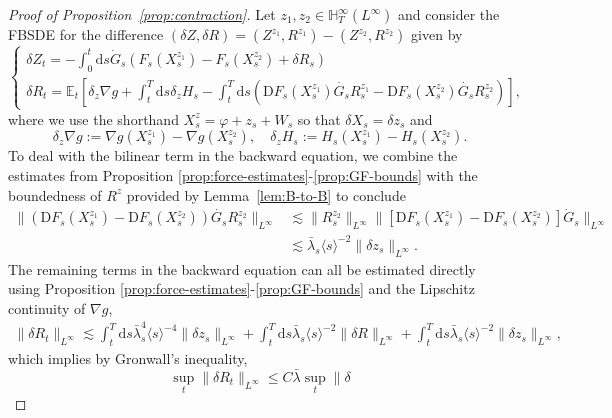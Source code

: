 \documentclass[11pt, a4paper]{scrartcl}
\numberwithin{equation}{section}
\theoremstyle{plain}
\theoremstyle{remark}
\newcommand{\assign}{:=}
\newcommand{\mathD}{\mathrm{D}}
\newcommand{\mathd}{\mathrm{d}}
\begin{document}
\begin{proof}[Proof of Proposition~\ref{prop:contraction}]
  Let $z_1, z_2 \in \mathbb{H}^{\infty}_T (L^{\infty})$ and consider the FBSDE
  for the difference $(\delta Z, \delta R) = (Z^{z_1}, R^{z_1}) - (Z^{z_2},
  R^{z_2})$ given by
  \begin{equation}
    \begin{cases}
      \delta Z_t = - \int_0^t \mathd s \dot{G}_s (F_s (X^{z_1}_s) - F_s
      (X^{z_2}_s) + \delta R_s)\\
      \delta R_t =\mathbb{E}_t \left[ \delta_z \nabla g + \int_t^T \mathd s
      \delta_z H_s - \int_t^T \mathd s (\mathD F_s (X^{z_1}_s) \dot{G_s}
      R^{z_1}_s - \mathD F_s (X^{z_2}_s) \dot{G_s} R^{z_2}_s) \right],
    \end{cases} \label{eq:FBSDE-spread}
  \end{equation}
  where we use the shorthand $X_s^z = \varphi + z_s + W_s$ so that $\delta X_s
  = \delta z_s$ and
  \[ \delta_z \nabla g \assign \nabla g (X^{z_1}_s) - \nabla g (X^{z_2}_s),
     \quad \delta_z H_s \assign H_s (X^{z_1}_s) - H_s (X^{z_2}_s) . \]
  To deal with the bilinear term in the backward equation, we combine the
  estimates from Proposition \ref{prop:force-estimates}-\ref{prop:GF-bounds}
  with the boundedness of $R^z$ provided by Lemma~\ref{lem:B-to-B} to conclude
  \begin{align*}
    \| (\mathD F_s (X^{z_1}_s) - \mathD F_s (X^{z_2}_s)) \dot{G_s} R^{z_2}_s
     \|_{L^{\infty}} 
     &\lesssim \| R^{z_2}_s \|_{L^{\infty}} \| [\mathD F_s
     (X^{z_1}_s) - \mathD F_s (X^{z_2}_s)]  \dot{G}_s \|_{L^{\infty}} \\
     &\lesssim
     \bar{\lambda}_s \langle s \rangle^{- 2} \| \delta z_s \|_{L^{\infty}} .
  \end{align*}
  The remaining terms in the backward equation can all be estimated directly
  using Proposition \ref{prop:force-estimates}-\ref{prop:GF-bounds} and the
  Lipschitz continuity of $\nabla g$,
  \begin{align*}
       \| \delta R_t \|_{L^{\infty}}\lesssim \int_t^T \mathd s \bar{\lambda}_s^4 \langle s \rangle^{- 4} \|
       \delta z_s \|_{L^{\infty}} + \int_t^T \mathd s \bar{\lambda}_s \langle s
       \rangle^{- 2} \| \delta R \|_{L^{\infty}} + \int_t^T \mathd s \bar{\lambda}_s
       \langle s \rangle^{- 2} \| \delta z_s \|_{L^{\infty}},
     \end{align*}
  which implies by Gronwall's inequality,
  \[ \sup_t \| \delta R_t \|_{L^{\infty}} \leqslant C \bar{\lambda} \sup_t \| \delta
\]
\end{proof}
\end{document}
